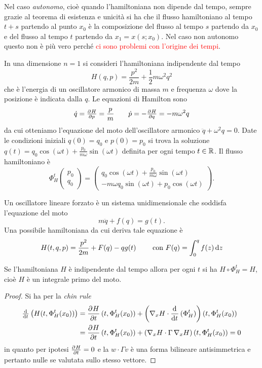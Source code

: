 Nel caso \emph{autonomo}, cioè quando l'hamiltoniana non dipende dal tempo, sempre grazie al teorema di esistenza e unicità si ha che il flusso hamiltoniano al tempo $ t+s $ partendo al punto $ x_0 $ è la composizione del flusso al tempo $ s $ partendo da $ x_0 $ e del flusso al tempo $ t $ partendo da $ x_1 = x(s; x_0) $. Nel caso non autonomo questo non è più vero perché \textcolor{red}{ci sono problemi con l'origine dei tempi}.

\begin{example}
    In una dimensione $ n = 1 $ si consideri l'hamiltoniana indipendente dal tempo
    \[
        H(q, p) = \frac{p^2}{2m} + \frac{1}{2} m \omega^2 q^2
    \]
    che è l'energia di un oscillatore armonico di massa $ m $ e frequenza $ \omega $ dove la posizione è indicata dalla $ q $. Le equazioni di Hamilton sono
    \[
        \dot{q} = \pd{H}{p} = \frac{p}{m} \qquad \dot{p} = -\pd{H}{q} = -m\omega^2 q
    \]
    da cui otteniamo l'equazione del moto dell'oscillatore armonico $ \ddot{q} + \omega^2 q = 0 $. Date le condizioni iniziali $ q(0) = q_0 $ e $ p(0) = p_0 $ si trova la soluzione $ q(t) = q_0 \cos{(\omega t)} + \frac{p_0}{m\omega} \sin{(\omega t)} $ definita per ogni tempo $ t \in \mathbb{R} $. Il flusso hamiltoniano è
    \[
        \Phi^t_H
        \begin{pmatrix}
        p_0 \\
        q_0
        \end{pmatrix}
        =
        \begin{pmatrix}
        q_0 \cos{(\omega t)} + \frac{p_0}{m\omega} \sin{(\omega t)} \\
        -m \omega q_0 \sin{(\omega t)} + p_0\cos{(\omega t)}
        \end{pmatrix}.
    \]
\end{example}

\begin{example}
    Un oscillatore lineare forzato è un sistema unidimensionale che soddisfa l'equazione del moto
    \[
        m\ddot{q} + f(q) = g(t).
    \]
    Una possibile hamiltoniana da cui deriva tale equazione è
    \[
        H(t, q, p) = \frac{p^2}{2m} + F(q) - q g(t) \qquad \text{ con } F(q) = \int_0^q f(z) \dif{z}
    \]
\end{example}

\begin{thm}
    Se l'hamiltoniana $ H $ è indipendente dal tempo allora per ogni $ t $ si ha $ H \circ \Phi_H^t = H $, cioè $ H $ è un integrale primo del moto.
\end{thm}
\begin{proof}
    Si ha per la \emph{chin rule}
    \begin{align*}
        \od{}{t} \left(H(t, \Phi_H^t(x_0))\right) & = \dpd{H}{t}(t, \Phi_H^t(x_0)) + \left(\nabla_x H \cdot \dod{}{t}(\Phi^t_H)\right)(t, \Phi^t_H(x_0)) \\
        & = \dpd{H}{t}(t, \Phi_H^t(x_0)) + \left(\nabla_x H \cdot \Gamma \, \nabla_x H\right)(t, \Phi^t_H(x_0)) = 0
    \end{align*}
    in quanto per ipotesi $ \pd{H}{t} = 0 $ e la $ w \cdot \Gamma v $ è una forma bilineare antisimmetrica e pertanto nulle se valutata sullo stesso vettore.
\end{proof}